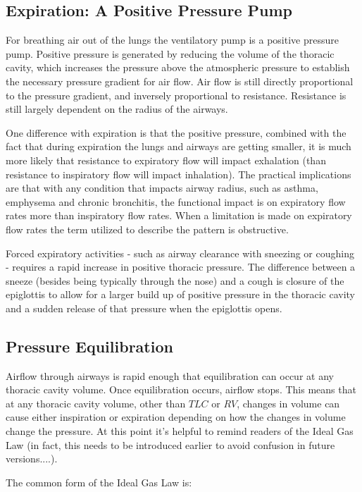 \subsection{Expiration: A Positive Pressure Pump} For breathing air out of the lungs the ventilatory pump is a positive pressure pump. Positive pressure is generated by reducing the volume of the thoracic cavity, which increases the pressure above the atmospheric pressure to establish the necessary pressure gradient for air flow. Air flow is still directly proportional to the pressure gradient, and inversely proportional to resistance. Resistance is still largely dependent on the radius of the airways. 

One difference with expiration is that the positive pressure, combined with the fact that during expiration the lungs and airways are getting smaller, it is much more likely that resistance to expiratory flow will impact exhalation (than resistance to inspiratory flow will impact inhalation). The practical implications are that with any condition that impacts airway radius, such as asthma, emphysema and chronic bronchitis, the functional impact is on expiratory flow rates more than inspiratory flow rates. When a limitation is made on expiratory flow rates the term utilized to describe the pattern is obstructive. 

Forced expiratory activities - such as airway clearance with sneezing or coughing - requires a rapid increase in positive thoracic pressure. The difference between a sneeze (besides being typically through the nose) and a cough is closure of the epiglottis to allow for a larger build up of positive pressure in the thoracic cavity and a sudden release of that pressure when the epiglottis opens.  

\subsection{Pressure Equilibration} 
Airflow through airways is rapid enough that equilibration can occur at any thoracic cavity volume. Once equilibration occurs, airflow stops. This means that at any thoracic cavity volume, other than $TLC$ or $RV$, changes in volume can cause either inspiration or expiration depending on how the changes in volume change the pressure. At this point it's helpful to remind readers of the Ideal Gas Law (in fact, this needs to be introduced earlier to avoid confusion in future versions....). 

The common form of the Ideal Gas Law is: 

